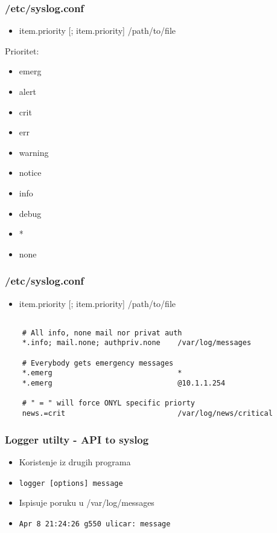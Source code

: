 \documentclass[t,table,usenames,dvipsnames]{beamer}
\newcommand{\shell}[1]{\texttt{#1}}
\begin{document}
\begin{frame}
    \frametitle{/etc/syslog.conf}
    \begin{itemize}
        \item item.priority [; item.priority]   /path/to/file
    \end{itemize}

    Prioritet: \\
    \begin{itemize}
        \item emerg
        \item alert
        \item crit
        \item err
        \item warning
        \item notice
        \item info
        \item debug
        \item *
        \item none
    \end{itemize}
\end{frame}

\begin{frame}[fragile]
    \frametitle{/etc/syslog.conf}
    \begin{itemize}
        \item item.priority [; item.priority]   /path/to/file
    \end{itemize}
    \begin{verbatim}

    # All info, none mail nor privat auth
    *.info; mail.none; authpriv.none    /var/log/messages

    # Everybody gets emergency messages
    *.emerg                             *
    *.emerg                             @10.1.1.254
    
    # " = " will force ONYL specific priorty
    news.=crit                          /var/log/news/critical

    \end{verbatim}

\end{frame}

\begin{frame}[fragile]
    \frametitle{Logger utilty - API to syslog}

    \begin{itemize}
        \item Koristenje iz drugih programa

        \item \shell{logger [options] message}
        \item Ispisuje poruku u /var/log/messages

        \item \shell{Apr  8 21:24:26 g550 ulicar: message}

    \end{itemize}

\end{frame}
\end{document}
